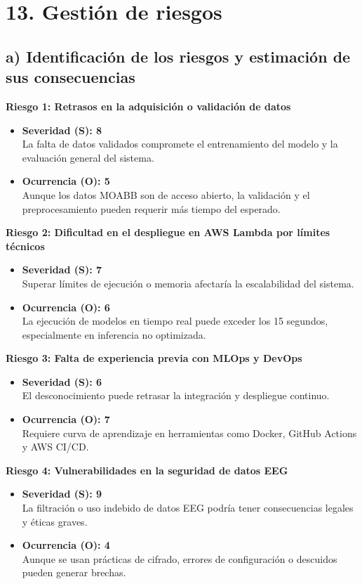 \documentclass[
11pt, %
]{charter}
\begin{document}
\section{13. Gestión de riesgos}
\label{sec:riesgos}

\subsection*{a) Identificación de los riesgos y estimación de sus consecuencias}

\textbf{Riesgo 1: Retrasos en la adquisición o validación de datos}
\begin{itemize}
    \item \textbf{Severidad (S): 8} \\
    La falta de datos validados compromete el entrenamiento del modelo y la evaluación general del sistema.
    \item \textbf{Ocurrencia (O): 5} \\
    Aunque los datos MOABB son de acceso abierto, la validación y el preprocesamiento pueden requerir más tiempo del esperado.
\end{itemize}

\textbf{Riesgo 2: Dificultad en el despliegue en AWS Lambda por límites técnicos}
\begin{itemize}
    \item \textbf{Severidad (S): 7} \\
    Superar límites de ejecución o memoria afectaría la escalabilidad del sistema.
    \item \textbf{Ocurrencia (O): 6} \\
    La ejecución de modelos en tiempo real puede exceder los 15 segundos, especialmente en inferencia no optimizada.
\end{itemize}

\textbf{Riesgo 3: Falta de experiencia previa con MLOps y DevOps}
\begin{itemize}
    \item \textbf{Severidad (S): 6} \\
    El desconocimiento puede retrasar la integración y despliegue continuo.
    \item \textbf{Ocurrencia (O): 7} \\
    Requiere curva de aprendizaje en herramientas como Docker, GitHub Actions y AWS CI/CD.
\end{itemize}

\textbf{Riesgo 4: Vulnerabilidades en la seguridad de datos EEG}
\begin{itemize}
    \item \textbf{Severidad (S): 9} \\
    La filtración o uso indebido de datos EEG podría tener consecuencias legales y éticas graves.
    \item \textbf{Ocurrencia (O): 4} \\
    Aunque se usan prácticas de cifrado, errores de configuración o descuidos pueden generar brechas.
\end{itemize}
\end{document}
